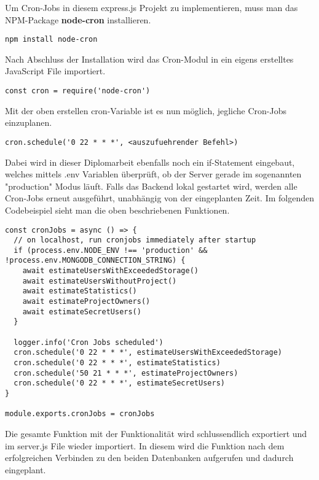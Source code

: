 Um Cron-Jobs in diesem express.js Projekt zu implementieren, muss man das NPM-Package \textbf{node-cron} installieren.
\begin{verbatim}
npm install node-cron
\end{verbatim}
Nach Abschluss der Installation wird das Cron-Modul in ein eigens erstelltes JavaScript File importiert.
\begin{verbatim}
const cron = require('node-cron')
\end{verbatim}
Mit der oben erstellen cron-Variable ist es nun möglich, jegliche Cron-Jobs einzuplanen.
\newline
\begin{lstlisting}
cron.schedule('0 22 * * *', <auszufuehrender Befehl>)
\end{lstlisting}
Dabei wird in dieser Diplomarbeit ebenfalls noch ein if-Statement eingebaut, welches mittels .env Variablen überprüft, ob der Server gerade im sogenannten "production" Modus läuft. Falls das Backend lokal gestartet wird, werden alle Cron-Jobs erneut ausgeführt, unabhängig von der eingeplanten Zeit. Im folgenden Codebeispiel sieht man die oben beschriebenen Funktionen.
\newline
\begin{lstlisting}[caption=Einplanen der Cron-Jobs]
const cronJobs = async () => {
  // on localhost, run cronjobs immediately after startup
  if (process.env.NODE_ENV !== 'production' && !process.env.MONGODB_CONNECTION_STRING) {
    await estimateUsersWithExceededStorage()
    await estimateUsersWithoutProject()
    await estimateStatistics()
    await estimateProjectOwners()
    await estimateSecretUsers()
  }

  logger.info('Cron Jobs scheduled')
  cron.schedule('0 22 * * *', estimateUsersWithExceededStorage)
  cron.schedule('0 22 * * *', estimateStatistics)
  cron.schedule('50 21 * * *', estimateProjectOwners)
  cron.schedule('0 22 * * *', estimateSecretUsers)
}

module.exports.cronJobs = cronJobs
\end{lstlisting}
Die gesamte Funktion mit der Funktionalität wird schlussendlich exportiert und im server.js File wieder importiert. In diesem wird die Funktion nach dem erfolgreichen Verbinden zu den beiden Datenbanken aufgerufen und dadurch eingeplant.
